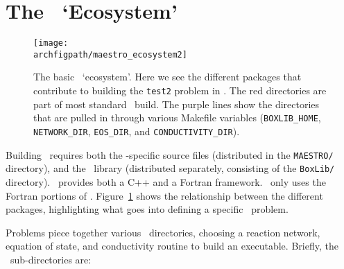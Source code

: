 \section{The \maestro\ `Ecosystem'}

\begin{figure}[]
\centering
\texttt{[image: \\archfigpath/maestro\_ecosystem2]}
\caption[\maestro\ `ecosystem'] {\label{fig:arch:eco} The basic
  \maestro\ `ecosystem'.  Here we see the different packages that
  contribute to building the {\tt test2} problem in \maestro.  The
  red directories are part of most standard \maestro\ build.  The
  purple lines show the directories that are pulled in through
  various Makefile variables ({\tt BOXLIB\_HOME}, {\tt NETWORK\_DIR},
  {\tt EOS\_DIR}, and {\tt CONDUCTIVITY\_DIR}).}
\end{figure}


Building \maestro\ requires both the \maestro-specific source
files (distributed in the {\tt MAESTRO/} directory), and the
\boxlib\ library (distributed separately, consisting of the {\tt BoxLib/} directory).
\boxlib\ provides both a C++ and a Fortran framework.  \maestro\
only uses the Fortran portions of \boxlib.  Figure~\ref{fig:arch:eco}
shows the relationship between the different packages, highlighting
what goes into defining a specific \maestro\ problem.

Problems piece together various \maestro\ directories, choosing a
reaction network, equation of state, and conductivity routine to build
an executable.  Briefly, the \maestro\ sub-directories are:

